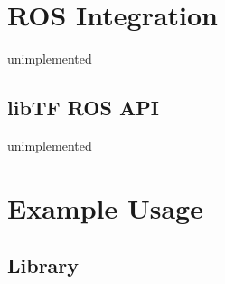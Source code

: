 \documentclass[12pt]{article}
\begin{document}
\section{ROS Integration}

unimplemented
\subsection{libTF ROS API}
unimplemented

\section{Example Usage}
\subsection{Library}
\end{document}
